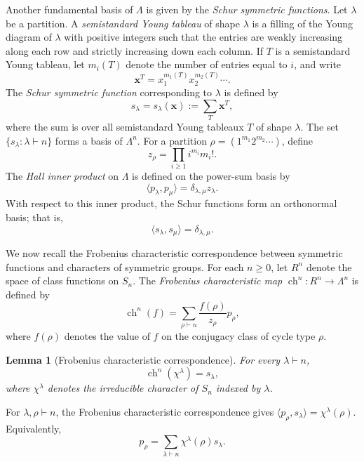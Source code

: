 \documentclass[12pt]{article}
\newtheorem{lemma}{Lemma}[section]
\theoremstyle{definition}
\newcommand{\1}{\mathbf 1}
\begin{document}
Another fundamental basis of $\Lambda$ is given by the \emph{Schur symmetric
functions}. Let $\lambda$ be a partition. A \emph{semistandard Young tableau}
of shape $\lambda$ is a filling of the Young diagram of $\lambda$ with
positive integers such that the entries are weakly increasing along each
row and strictly increasing down each column. If $T$ is a semistandard
Young tableau, let $m_i(T)$ denote the number of entries equal to $i$, and
write
$$
\mathbf{x}^T
=
x_1^{m_1(T)}x_2^{m_2(T)}\cdots.
$$
The \emph{Schur symmetric function} corresponding to $\lambda$ is defined by
$$
s_\lambda=s_\lambda(\mathbf{x})
:=
\sum_T \mathbf{x}^T,
$$
where the sum is over all semistandard Young tableaux $T$ of shape
$\lambda$. The set $
\{s_\lambda:\lambda\vdash n\}
$ forms a basis of $\Lambda^n$. For a partition $\rho=(1^{m_1}2^{m_2}\cdots)$, define
$$
z_\rho=\prod_{i\geq 1}i^{m_i}m_i!.
$$
The \emph{Hall inner product} on $\Lambda$ is defined on the power-sum basis by
$$
\langle p_\lambda,p_\mu\rangle
=
\delta_{\lambda,\mu}z_\lambda.
$$
With respect to this inner product, the Schur functions form an
orthonormal basis; that is,
$$
\langle s_\lambda,s_\mu\rangle
=
\delta_{\lambda,\mu}.
$$

We now recall the Frobenius characteristic correspondence between
symmetric functions and characters of symmetric groups. For each $n\geq 0$, let $R^n$ denote the space of
class functions on $S_n$. 
The \emph{Frobenius characteristic map} $
\operatorname{ch}^n:R^n\longrightarrow\Lambda^n$ is defined by
$$
\operatorname{ch}^n(f)
=
\sum_{\rho\vdash n}
\frac{f(\rho)}{z_\rho}p_\rho,
$$
where $f(\rho)$ denotes the value of $f$ on the conjugacy class of
cycle type $\rho$.

\begin{lemma}[Frobenius characteristic correspondence]
\label{lem:Frobenius_characteristic}
For every
$\lambda\vdash n$,
$$
\operatorname{ch}^n(\chi^\lambda)=s_\lambda,
$$
where $\chi^\lambda$ denotes the irreducible character of $S_n$
indexed by $\lambda$.
\end{lemma}

For $\lambda,\rho\vdash n$, the Frobenius characteristic correspondence gives $\langle p_\rho,s_\lambda\rangle=\chi^\lambda(\rho).$ Equivalently,
\begin{equation}\label{eq:p_1_j}
p_\rho
=
\sum_{\lambda\vdash n}
\chi^\lambda(\rho)s_\lambda.
\end{equation}
\end{document}

